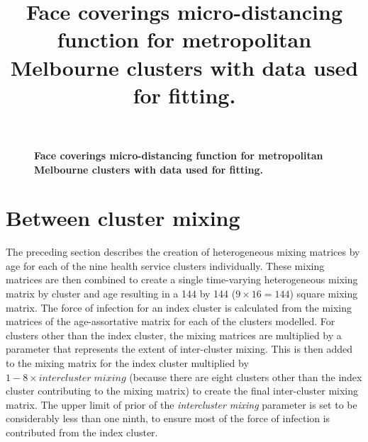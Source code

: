 \begin{figure}[ht]
    \caption{\textbf{Face coverings micro-distancing function for metropolitan Melbourne clusters with data used for fitting.}}
	\label{fig:face}
	\title{Face coverings micro-distancing function for metropolitan Melbourne clusters with data used for fitting.}
\end{figure}

\section{Between cluster mixing}
The preceding section describes the creation of heterogeneous mixing matrices by age for each of the nine health service clusters individually. These mixing matrices are then combined to create a single time-varying heterogeneous mixing matrix by cluster and age resulting in a 144 by 144 (\(9\times16=144\)) square mixing matrix. The force of infection for an index cluster is calculated from the mixing matrices of the age-assortative matrix for each of the clusters modelled. For clusters other than the index cluster, the mixing matrices are multiplied by a parameter that represents the extent of inter-cluster mixing. This is then added to the mixing matrix for the index cluster multiplied by \(1-8\times intercluster\;mixing\) (because there are eight clusters other than the index cluster contributing to the mixing matrix) to create the final inter-cluster mixing matrix. The upper limit of prior of the \textit{intercluster mixing} parameter is set to be considerably less than one ninth, to ensure most of the force of infection is contributed from the index cluster.
